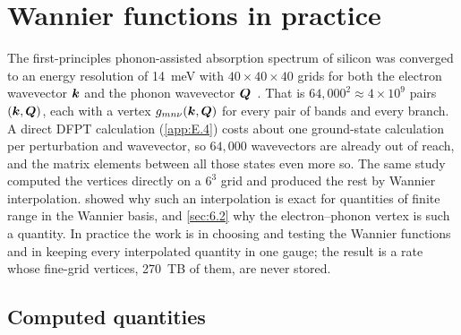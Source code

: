 \section{Wannier functions in practice}\label{app:E.5}

The first-principles phonon-assisted absorption spectrum of silicon was converged to an energy resolution of \SI{14}{meV} with $40\times40\times40$ grids for both the electron wavevector $\bm{k}$ and the phonon wavevector $\bm{Q}$~\cite{noffsinger2012phonon}. That is $64{,}000^2 \approx 4\times10^{9}$ pairs $(\bm{k},\bm{Q})$, each with a vertex $g_{mn\nu}(\bm{k},\bm{Q})$ for every pair of bands and every branch. A direct DFPT calculation (\cref{app:E.4}) costs about one ground-state calculation per perturbation and wavevector, so $64{,}000$ wavevectors are already out of reach, and the matrix elements between all those states even more so. The same study computed the vertices directly on a $6^3$ grid and produced the rest by Wannier interpolation.  showed why such an interpolation is exact for quantities of finite range in the Wannier basis, and \cref{sec:6.2} why the electron--phonon vertex is such a quantity. In practice the work is in choosing and testing the Wannier functions and in keeping every interpolated quantity in one gauge; the result is a rate whose fine-grid vertices, \SI{270}{TB} of them, are never stored.

\subsection{Computed quantities}

